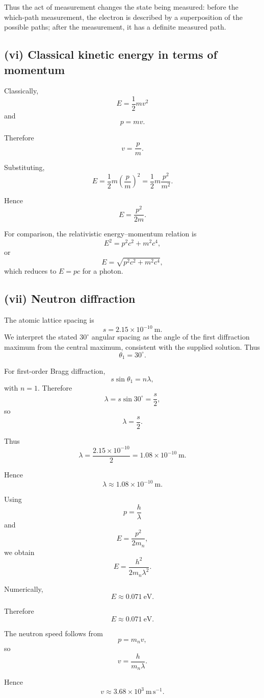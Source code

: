 \documentclass[11pt,a4paper]{article}
\begin{document}
Thus the act of measurement changes the state being measured: before the
which-path measurement, the electron is described by a superposition of the
possible paths; after the measurement, it has a definite measured path.

\subsection{(vi) Classical kinetic energy in terms of momentum}

Classically,
\[
E=\frac12mv^2
\]
and
\[
p=mv.
\]

Therefore
\[
v=\frac pm.
\]

Substituting,
\[
E
=
\frac12m\left(\frac pm\right)^2
=
\frac12m\frac{p^2}{m^2}.
\]

Hence
\[
\boxed{E=\frac{p^2}{2m}}.
\]

For comparison, the relativistic energy--momentum relation is
\[
E^2=p^2c^2+m^2c^4,
\]
or
\[
\boxed{E=\sqrt{p^2c^2+m^2c^4}},
\]
which reduces to $E=pc$ for a photon.

\subsection{(vii) Neutron diffraction}

The atomic lattice spacing is
\[
s=2.15\times10^{-10}\ \mathrm m.
\]
We interpret the stated $30^\circ$ angular spacing as the angle of the first
diffraction maximum from the central maximum, consistent with the supplied
solution. Thus
\[
\theta_1=30^\circ.
\]

For first-order Bragg diffraction,
\[
s\sin\theta_1=n\lambda,
\]
with $n=1$. Therefore
\[
\lambda=s\sin30^\circ=\frac{s}{2},
\]
so
\[
\boxed{\lambda=\frac{s}{2}}.
\]

Thus
\[
\lambda
=
\frac{2.15\times10^{-10}}{2}
=
1.08\times10^{-10}\ \mathrm m.
\]

Hence
\[
\boxed{\lambda\approx1.08\times10^{-10}\ \mathrm m}.
\]

Using
\[
p=\frac h\lambda
\]
and
\[
E=\frac{p^2}{2m_n},
\]
we obtain
\[
E
=
\frac{h^2}{2m_n\lambda^2}.
\]

Numerically,
\[
E\approx0.071\ \mathrm{eV}.
\]

Therefore
\[
\boxed{E\approx0.071\ \mathrm{eV}}.
\]

The neutron speed follows from
\[
p=m_nv,
\]
so
\[
v=\frac{h}{m_n\lambda}.
\]

Hence
\[
\boxed{v\approx3.68\times10^3\ \mathrm{m\,s^{-1}}}.
\]
\end{document}
